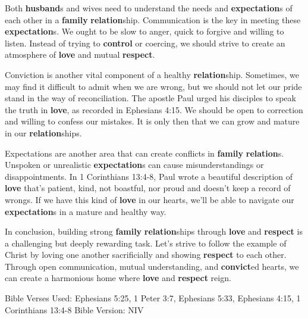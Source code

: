\documentclass{article}
\begin{document}
Both \textbf{\textbf{husband}}s and wives need to understand the needs and \textbf{\textbf{expectation}}s of each other in a \textbf{\textbf{family}} \textbf{\textbf{relation}}ship. Communication is the key in meeting these \textbf{\textbf{expectation}}s. We ought to be slow to anger, quick to forgive and willing to listen. Instead of trying to \textbf{\textbf{control}} or coercing, we should strive to create an atmosphere of \textbf{\textbf{love}} and mutual \textbf{\textbf{respect}}.

Conviction is another vital component of a healthy \textbf{\textbf{relation}}ship. Sometimes, we may find it difficult to admit when we are wrong, but we should not let our pride stand in the way of reconciliation. The apostle Paul urged his disciples to speak the truth in \textbf{\textbf{love}}, as recorded in Ephesians 4:15. We should be open to correction and willing to confess our mistakes. It is only then that we can grow and mature in our \textbf{\textbf{relation}}ships.

Expectations are another area that can create conflicts in \textbf{\textbf{family}} \textbf{\textbf{relation}}s. Unspoken or unrealistic \textbf{\textbf{expectation}}s can cause misunderstandings or disappointments. In 1 Corinthians 13:4-8, Paul wrote a beautiful description of \textbf{\textbf{love}} that's patient, kind, not boastful, nor proud and doesn't keep a record of wrongs. If we have this kind of \textbf{\textbf{love}} in our hearts, we'll be able to navigate our \textbf{\textbf{expectation}}s in a mature and healthy way.

In conclusion, building strong \textbf{\textbf{family}} \textbf{\textbf{relation}}ships through \textbf{\textbf{love}} and \textbf{\textbf{respect}} is a challenging but deeply rewarding task. Let's strive to follow the example of Christ by loving one another sacrificially and showing \textbf{\textbf{respect}} to each other. Through open communication, mutual understanding, and \textbf{\textbf{convict}}ed hearts, we can create a harmonious home where \textbf{\textbf{love}} and \textbf{\textbf{respect}} reign.

Bible Verses Used: Ephesians 5:25, 1 Peter 3:7, Ephesians 5:33, Ephesians 4:15, 1 Corinthians 13:4-8
Bible Version: NIV
\end{document}

